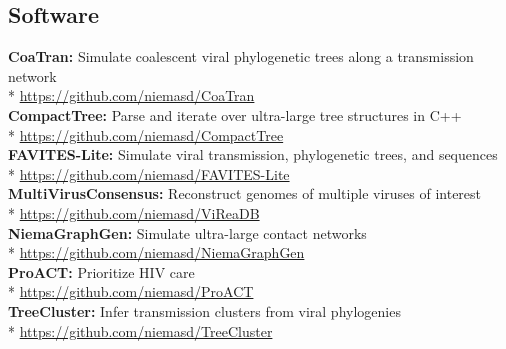 \documentclass[margin,line]{res}
\begin{document}
\begin{resume}
\section{\sc Software}
\textbf{CoaTran:} Simulate coalescent viral phylogenetic trees along a transmission network\\*\vspace{2mm}
\hspace*{4mm} \href{https://github.com/niemasd/CoaTran}{https://github.com/niemasd/CoaTran}\\
\textbf{CompactTree:} Parse and iterate over ultra-large tree structures in C++\\*\vspace{2mm}
\hspace*{4mm} \href{https://github.com/niemasd/CompactTree}{https://github.com/niemasd/CompactTree}\\
\textbf{FAVITES-Lite:} Simulate viral transmission, phylogenetic trees, and sequences\\*\vspace{2mm}
\hspace*{4mm} \href{https://github.com/niemasd/FAVITES-Lite}{https://github.com/niemasd/FAVITES-Lite}\\
\textbf{MultiVirusConsensus:} Reconstruct genomes of multiple viruses of interest\\*\vspace{2mm}
\hspace*{4mm} \href{https://github.com/niemasd/MultiVirusConsensus}{https://github.com/niemasd/ViReaDB}\\
\textbf{NiemaGraphGen:} Simulate ultra-large contact networks\\*\vspace{2mm}
\hspace*{4mm} \href{https://github.com/niemasd/NiemaGraphGen}{https://github.com/niemasd/NiemaGraphGen}\\
\textbf{ProACT:} Prioritize HIV care\\*\vspace{2mm}
\hspace*{4mm} \href{https://github.com/niemasd/ProACT}{https://github.com/niemasd/ProACT}\\
\textbf{TreeCluster:} Infer transmission clusters from viral phylogenies\\*\vspace{2mm}
\hspace*{4mm} \href{https://github.com/niemasd/TreeCluster}{https://github.com/niemasd/TreeCluster}\\

\end{resume}
\end{document}
